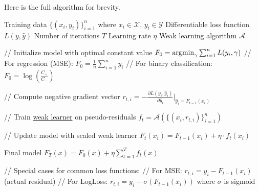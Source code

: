   \begin{algo}
    Here is the full algorithm for brevity. 
    \begin{algorithm}[H]
      \label{alg:gradboost}
      \begin{algorithmic}[1]
        \Require Training data $\{(x_i, y_i)\}_{i=1}^n$ where $x_i \in \mathcal{X}$, $y_i \in \mathcal{Y}$
        \Require Differentiable loss function $L(y, \hat{y})$
        \Require Number of iterations $T$
        \Require Learning rate $\eta$
        \Require Weak learning algorithm $\mathcal{A}$

        \State // Initialize model with optimal constant value
        \State $F_0 = \operatorname*{\arg\!\min}_\gamma \sum_{i=1}^n L(y_i, \gamma)$
        \State // For regression (MSE): $F_0 = \frac{1}{n}\sum_{i=1}^n y_i$
        \State // For binary classification: $F_0 = \log(\frac{C_+}{C_-})$

            \State // Compute negative gradient vector
                \State $r_{t,i} = -\frac{\partial L(y_i, \hat{y}_i)}{\partial \hat{y}_i}\big|_{\hat{y}_i = F_{t-1}(x_i)}$
            \EndFor
            
            \State // Train \hyperref[def:weak-learner]{weak learner} on pseudo-residuals
            \State $f_t = \mathcal{A}(\{(x_i, r_{t,i})\}_{i=1}^n)$
            
            \State // Update model with scaled weak learner
                \State $F_t(x_i) = F_{t-1}(x_i) + \eta \cdot f_t(x_i)$
            \EndFor
        \EndFor

        \State \Return Final model $F_T(x) = F_0(x) + \eta \sum_{t=1}^T f_t(x)$

        \State // Special cases for common loss functions:
        \State // For MSE: $r_{t,i} = y_i - F_{t-1}(x_i)$ (actual residual)
        \State // For LogLoss: $r_{t,i} = y_i - \sigma(F_{t-1}(x_i))$ where $\sigma$ is sigmoid
      \end{algorithmic}
    \end{algorithm}
  \end{algo}

